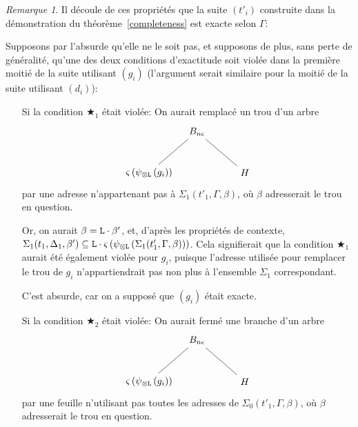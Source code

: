 \documentclass[11pt,a4paper]{article}
\theoremstyle{plain}
\theoremstyle{definition}
\theoremstyle{remark}
\newtheorem{remark}{Remarque}
\newcommand*{\tensor}{\otimes}
\newcommand*{\someperm}{\varsigma}
\newcommand*{\sequent}{\Gamma}
\newcommand*{\sequentbis}{\Delta}
\newcommand*{\Left}{\textnormal{\texttt{L}}}
\newcommand*{\unknown}{H}
\newcommand*{\lowapprox}{\ensuremath{\Sigma_0}}
\newcommand*{\highapprox}{\ensuremath{\Sigma_1}}
\newcommand*{\exactcond}{\bigstar_1}
\newcommand*{\exactcondbis}{\bigstar_2}
\begin{document}
\begin{remark}
    Il découle de ces propriétés que la suite $(t'_i)$ construite dans la démonstration du théorème~\ref{completeness} est exacte selon $\sequent$:

    Supposons par l'absurde qu'elle ne le soit pas, et supposons de plus, sans perte de généralité, qu'une des deux conditions d'exactitude soit violée dans la première moitié de la suite utilisant $(g_i)$ (l'argument serait similaire pour la moitié de la suite utilisant $(d_i)$):

    \begin{itemize}
        \item[Si la condition $\exactcond$ était violée:] On aurait remplacé un trou d'un arbre 
            \begin{equation*}
            \begin{tikzpicture}%
            [level 1/.style={sibling distance=3.5cm}]
            \node {$B_{n \epsilon}$}
                child {node {$\someperm \left( \psi_{\tensor\Left} \left(
                g_i\right) \right)$}}
                child {node {$\unknown$}
            };
            \end{tikzpicture}
            \end{equation*}
            par une adresse n'appartenant pas à $\highapprox(t'_1, \sequent, \beta)$, où $\beta$ adresserait le trou en question. 
            
            Or, on aurait $\beta = \Left \cdot \beta'$, et, d'après les propriétés de contexte, $\highapprox(t_1, \sequentbis_1, \beta') \subseteq \Left \cdot \someperm \left( \psi_{\tensor\Left} \left(\highapprox(t'_1, \sequent, \beta)\right) \right)$. Cela signifierait que la condition $\exactcond$ aurait été également violée pour $g_i$, puisque l'adresse utilisée pour remplacer le trou de $g_i$ n'appartiendrait pas non plus à l'ensemble $\highapprox$ correspondant. 
            
            C'est absurde, car on a supposé que $(g_i)$ était exacte.

        \item[Si la condition $\exactcondbis$ était violée:] On aurait fermé une branche d'un arbre 
            \begin{equation*}
            \begin{tikzpicture}%
            [level 1/.style={sibling distance=3.5cm}]
            \node {$B_{n \epsilon}$}
                child {node {$\someperm \left( \psi_{\tensor\Left} \left(
                g_i\right) \right)$}}
                child {node {$\unknown$}
            };
            \end{tikzpicture}
            \end{equation*}
            par une feuille n'utilisant pas toutes les adresses de $\lowapprox(t'_1, \sequent, \beta)$, où $\beta$ adresserait le trou en question. 
            

\end{itemize}
\end{remark}
\end{document}
